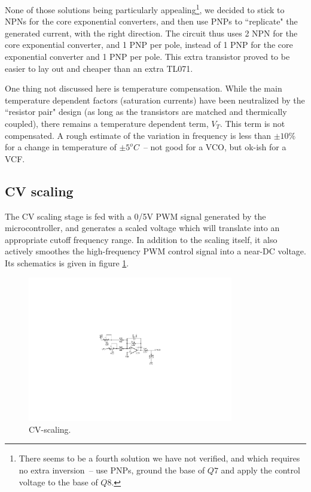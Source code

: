 \documentclass[a4paper,11pt]{article}
\begin{document}
None of those solutions being particularly appealing\footnote{There seems to be a fourth solution we have not verified, and which requires no extra inversion~-- use PNPs, ground the base of $Q7$ and apply the control voltage to the base of $Q8$.}, we decided to stick to NPNs for the core exponential converters, and then use PNPs to ``replicate" the generated current, with the right direction. The circuit thus uses 2 NPN for the core exponential converter, and 1 PNP per pole, instead of 1 PNP for the core exponential converter and 1 PNP per pole. This extra transistor proved to be easier to lay out and cheaper than an extra TL071.

One thing not discussed here is temperature compensation. While the main temperature dependent factors (saturation currents) have been neutralized by the ``resistor pair" design (as long as the transistors are matched and thermically coupled), there remains a temperature dependent term, $V_T$. This term is not compensated. A rough estimate of the variation in frequency is less than $\pm 10\%$ for a change in temperature of $\pm 5^oC$~-- not good for a VCO, but ok-ish for a VCF.

\subsection{CV scaling}

The CV scaling stage is fed with a 0/5V PWM signal generated by the microcontroller, and generates a scaled voltage which will translate into an appropriate cutoff frequency range. In addition to the scaling itself, it also actively smoothes the high-frequency PWM control signal into a near-DC voltage. Its schematics is given in figure \ref{fig:cvscale}.

\begin{figure}
\centering
\includegraphics[width=0.8\textwidth]{smr4_scaling.pdf}
\caption{CV-scaling.}
\label{fig:cvscale}
\end{figure}
\end{document}
